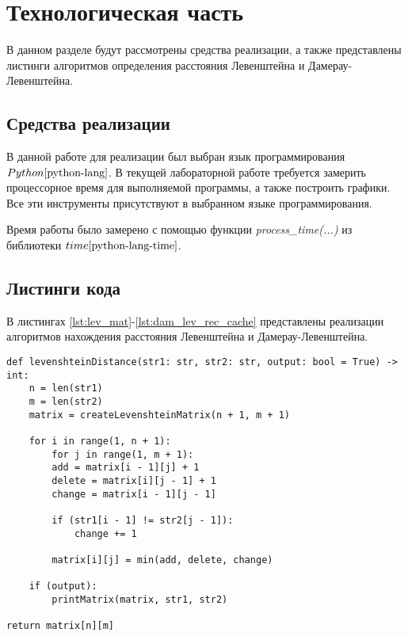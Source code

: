 \chapter{Технологическая часть}

В данном разделе будут рассмотрены средства реализации, а также представлены листинги алгоритмов определения расстояния Левенштейна и Дамерау-Левенштейна.

\section{Средства реализации}
В данной работе для реализации был выбран язык программирования $Python \cite{python-lang}$. В текущей лабораторной работе требуется замерить процессорное время для выполняемой программы, а также построить графики. Все эти инструменты присутствуют в выбранном языке программирования.

Время работы было замерено с помощью функции \textit{process\_time(...)} из библиотеки $time \cite{python-lang-time}$.


\section{Листинги кода}

В листингах \ref{lst:lev_mat}-\ref{lst:dam_lev_rec_cache} представлены реализации алгоритмов нахождения расстояния Левенштейна и Дамерау-Левенштейна.

\clearpage

\begin{center}
    \captionsetup{justification=raggedright,singlelinecheck=off}
    \begin{lstlisting}[label=lst:lev_mat,caption=Алгоритм нахождения расстояния Левенштейна (матричный)]
def levenshteinDistance(str1: str, str2: str, output: bool = True) -> int:
	n = len(str1)
	m = len(str2)
	matrix = createLevenshteinMatrix(n + 1, m + 1)
	
	for i in range(1, n + 1):
		for j in range(1, m + 1):
		add = matrix[i - 1][j] + 1
		delete = matrix[i][j - 1] + 1
		change = matrix[i - 1][j - 1]
		
		if (str1[i - 1] != str2[j - 1]):
			change += 1
		
		matrix[i][j] = min(add, delete, change)
	
	if (output):
		printMatrix(matrix, str1, str2)
	
return matrix[n][m]
\end{lstlisting}
\end{center}


